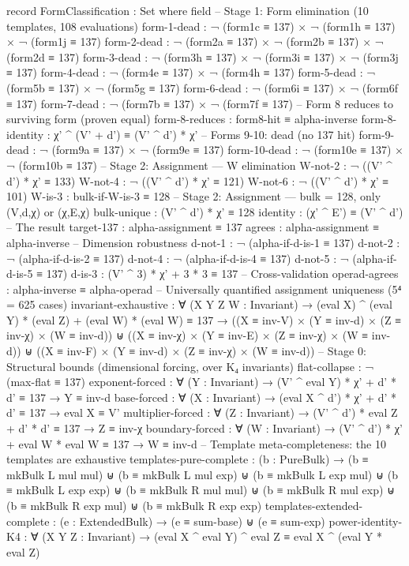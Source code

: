 \documentclass[11pt,a4paper]{article}
\begin{document}
\begin{code}
record FormClassification : Set where
  field
    -- Stage 1: Form elimination (10 templates, 108 evaluations)
    form-1-dead   : ¬ (form1c ≡ 137) × ¬ (form1h ≡ 137) × ¬ (form1j ≡ 137)
    form-2-dead   : ¬ (form2a ≡ 137) × ¬ (form2b ≡ 137) × ¬ (form2d ≡ 137)
    form-3-dead   : ¬ (form3h ≡ 137) × ¬ (form3i ≡ 137) × ¬ (form3j ≡ 137)
    form-4-dead   : ¬ (form4e ≡ 137) × ¬ (form4h ≡ 137)
    form-5-dead   : ¬ (form5b ≡ 137) × ¬ (form5g ≡ 137)
    form-6-dead   : ¬ (form6i ≡ 137) × ¬ (form6f ≡ 137)
    form-7-dead   : ¬ (form7b ≡ 137) × ¬ (form7f ≡ 137)
    -- Form 8 reduces to surviving form (proven equal)
    form-8-reduces : form8-hit ≡ alpha-inverse
    form-8-identity : χ' ^ (V' + d') ≡ (V' ^ d') * χ'
    -- Forms 9-10: dead (no 137 hit)
    form-9-dead   : ¬ (form9a ≡ 137) × ¬ (form9e ≡ 137)
    form-10-dead  : ¬ (form10e ≡ 137) × ¬ (form10b ≡ 137)
    -- Stage 2: Assignment — W elimination
    W-not-2       : ¬ ((V' ^ d') * χ' ≡ 133)
    W-not-4       : ¬ ((V' ^ d') * χ' ≡ 121)
    W-not-6       : ¬ ((V' ^ d') * χ' ≡ 101)
    W-is-3        : bulk-if-W-is-3 ≡ 128
    -- Stage 2: Assignment — bulk = 128, only (V,d,χ) or (χ,E,χ)
    bulk-unique    : (V' ^ d') * χ' ≡ 128
    identity       : (χ' ^ E') ≡ (V' ^ d')
    -- The result
    target-137     : alpha-assignment ≡ 137
    agrees         : alpha-assignment ≡ alpha-inverse
    -- Dimension robustness
    d-not-1        : ¬ (alpha-if-d-is-1 ≡ 137)
    d-not-2        : ¬ (alpha-if-d-is-2 ≡ 137)
    d-not-4        : ¬ (alpha-if-d-is-4 ≡ 137)
    d-not-5        : ¬ (alpha-if-d-is-5 ≡ 137)
    d-is-3         : (V' ^ 3) * χ' + 3 * 3 ≡ 137
    -- Cross-validation
    operad-agrees  : alpha-inverse ≡ alpha-operad
    -- Universally quantified assignment uniqueness (5⁴ = 625 cases)
    invariant-exhaustive : ∀ (X Y Z W : Invariant) →
      (eval X) ^ (eval Y) * (eval Z) + (eval W) * (eval W) ≡ 137 →
      ((X ≡ inv-V) × (Y ≡ inv-d) × (Z ≡ inv-χ) × (W ≡ inv-d))
      ⊎ ((X ≡ inv-χ) × (Y ≡ inv-E) × (Z ≡ inv-χ) × (W ≡ inv-d))
      ⊎ ((X ≡ inv-F) × (Y ≡ inv-d) × (Z ≡ inv-χ) × (W ≡ inv-d))
    -- Stage 0: Structural bounds (dimensional forcing, over K₄ invariants)
    flat-collapse     : ¬ (max-flat ≡ 137)
    exponent-forced   : ∀ (Y : Invariant) → (V' ^ eval Y) * χ' + d' * d' ≡ 137 → Y ≡ inv-d
    base-forced       : ∀ (X : Invariant) → (eval X ^ d') * χ' + d' * d' ≡ 137 → eval X ≡ V'
    multiplier-forced : ∀ (Z : Invariant) → (V' ^ d') * eval Z + d' * d' ≡ 137 → Z ≡ inv-χ
    boundary-forced   : ∀ (W : Invariant) → (V' ^ d') * χ' + eval W * eval W ≡ 137 → W ≡ inv-d
    -- Template meta-completeness: the 10 templates are exhaustive
    templates-pure-complete : (b : PureBulk) →
      (b ≡ mkBulk L mul mul) ⊎ (b ≡ mkBulk L mul exp) ⊎
      (b ≡ mkBulk L exp mul) ⊎ (b ≡ mkBulk L exp exp) ⊎
      (b ≡ mkBulk R mul mul) ⊎ (b ≡ mkBulk R mul exp) ⊎
      (b ≡ mkBulk R exp mul) ⊎ (b ≡ mkBulk R exp exp)
    templates-extended-complete : (e : ExtendedBulk) →
      (e ≡ sum-base) ⊎ (e ≡ sum-exp)
    power-identity-K4 : ∀ (X Y Z : Invariant) →
      (eval X ^ eval Y) ^ eval Z ≡ eval X ^ (eval Y * eval Z)


\end{code}
\end{document}
